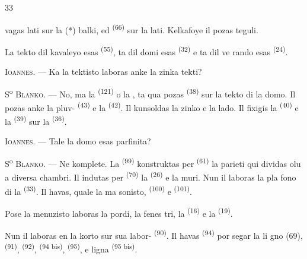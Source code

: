 \begin{VUpage}[35]{33}

\VUcontinue
vagas lati sur la (*) balki, ed  \textsuperscript{(66)} sur la\nl
lati. Kelkafoye il pozas teguli.

\VUblancAlinea
La tekto dil kavaleyo esas  \textsuperscript{(55)},\nl
ta dil domi esas  \textsuperscript{(32)} e ta dil ve\cc
rando esas  \textsuperscript{(24)}.

\VUblancAlinea
\textsc{Ioannes}. --- Ka la tektisto laboras anke la\nl
zinka tekti?

\VUblancAlinea
S\textsuperscript{o} \textsc{Blanko}. --- No, ma la  \textsuperscript{(121)}\nl
o la , ta qua pozas  \textsuperscript{(38)}\nl
sur la tekto di la domo. Il pozas anke la pluv-\nl
{} \textsuperscript{(43)} e la  \textsuperscript{(42)}. Il kunsoldas\nl
la zinko e la lado. Il fixigis la  \textsuperscript{(40)}\nl
e la  \textsuperscript{(39)} sur la  \textsuperscript{(36)}.

\VUblancAlinea
\textsc{Ioannes}. --- Tale la domo esas parfinita?

\VUsaut{3.0mm}
\VUsaut{3.0mm}

\VUblancAlinea
S\textsuperscript{o} \textsc{Blanko}. --- Ne komplete. La  \textsuperscript{(99)}\nl
konstruktas per  \textsuperscript{(61)} la parieti qui dividas\nl
olu a diversa chambri. Il indutas per  \textsuperscript{(70)}\nl
la  \textsuperscript{(26)} e la muri. Nun il laboras la pla\cc
fono di la  \textsuperscript{(33)}. Il havas, quale la ma\cc
sonisto,  \textsuperscript{(100)} e  \textsuperscript{(101)}.

\VUblancAlinea
Pose la menuzisto laboras la pordi, la fenes\cc
tri, la  \textsuperscript{(16)} e la  \textsuperscript{(19)}.

\VUblancAlinea
Nun il laboras en la korto sur sua labor-\nl
{} \textsuperscript{(90)}. Il havas  \textsuperscript{(94)} por segar la li\cc
gno (69),  \textsuperscript{(91)},  \textsuperscript{(92)},  \textsuperscript{(94 bis)},\nl
{} \textsuperscript{(95)}, e ligna  \textsuperscript{(95 bis)}.
\end{VUpage}

